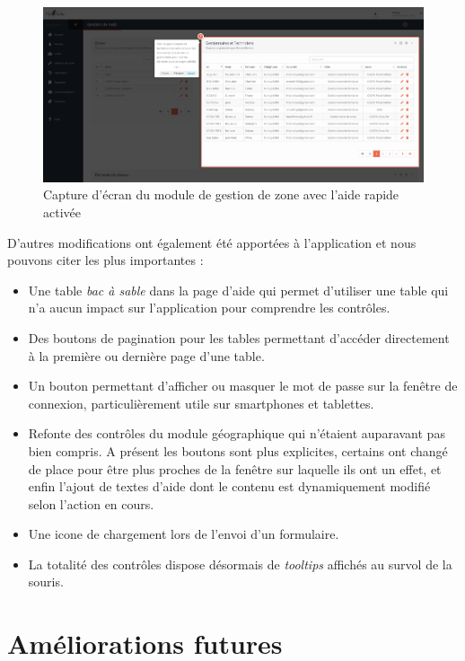 \documentclass{EPL-master-thesis-covers-FR}
\begin{document}
				\begin{figure}[H]
					\includegraphics[width=\textwidth]{images/screen_zone_quick_help.png}
					\caption{Capture d'écran du module de gestion de zone avec l'aide rapide activée}
					\label{fig:screen_zone_quick_help}
				\end{figure}

				D'autres modifications ont également été apportées à l'application et nous pouvons citer les plus importantes :
				\begin{itemize}
					\item Une table \emph{bac à sable} dans la page d'aide qui permet d'utiliser une table qui n'a aucun impact sur l'application pour comprendre les contrôles.
					\item Des boutons de pagination pour les tables permettant d'accéder directement à la première ou dernière page d'une table.
					\item Un bouton permettant d'afficher ou masquer le mot de passe sur la fenêtre de connexion, particulièrement utile sur smartphones et tablettes.
					\item Refonte des contrôles du module géographique qui n'étaient auparavant pas bien compris. A présent les boutons sont plus explicites, certains ont changé de place pour être plus proches de la fenêtre sur laquelle ils ont un effet, et enfin l'ajout de textes d'aide dont le contenu est dynamiquement modifié selon l'action en cours.
					\item Une icone de chargement lors de l'envoi d'un formulaire.
					\item La totalité des contrôles dispose désormais de \emph{tooltips} affichés au survol de la souris.
				\end{itemize}

	\chapter{Améliorations futures}
\end{document}

